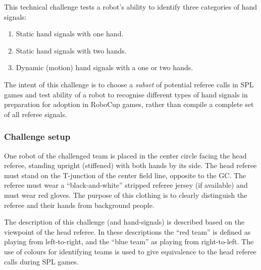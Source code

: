         This technical challenge tests a robot's ability to identify three categories of hand signals:
        \begin{enumerate}
            \item Static hand signals with one hand.
            \item Static hand signals with two hands.
            \item Dynamic (motion) hand signals with a one or two hands.
        \end{enumerate}
        
        The intent of this challenge is to choose a \emph{subset} of potential referee calls in SPL games and test ability of a robot to recognise different types of hand signals in preparation for adoption in RoboCup games, rather than compile a complete set of all referee signals.

    \subsubsection{Challenge setup}

        One robot of the challenged team is placed in the center circle facing the head referee, standing upright (stiffened) with both hands by its side.
        The head referee must stand on the T-junction of the center field line, opposite to the GC. The referee must wear a ``black-and-white'' stripped referee jersey (if available) and must  wear red gloves. The purpose of this clothing is to clearly distinguish the referee and their hands from background people. 
        
        The description of this challenge (and hand-signals) is described based on the viewpoint of the head referee. In these descriptions the ``red team'' is defined as playing from left-to-right, and the ``blue team'' as playing from right-to-left. The use of colours for identifying teams is used to give equivalence to the head referee calls during SPL games.
        
